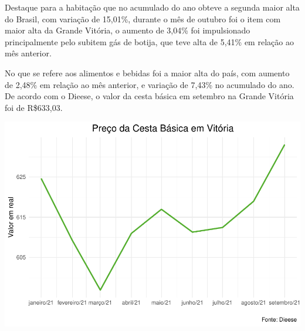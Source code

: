 \documentclass[100,a4paperpaper,]{article}
\begin{document}
Destaque para a habitação que no acumulado do ano obteve a segunda maior
alta do Brasil, com variação de 15,01\%, durante o mês de outubro foi o
item com maior alta da Grande Vitória, o aumento de 3,04\% foi
impulsionado principalmente pelo subitem gás de botija, que teve alta de
5,41\% em relação ao mês anterior.

No que se refere aos alimentos e bebidas foi a maior alta do país, com
aumento de 2,48\% em relação ao mês anterior, e variação de 7,43\% no
acumulado do ano. De acordo com o Dieese, o valor da cesta básica em
setembro na Grande Vitória foi de R\$633,03.

\includegraphics{inflacao_files/figure-latex/IPCA es-1.pdf}
\end{document}
